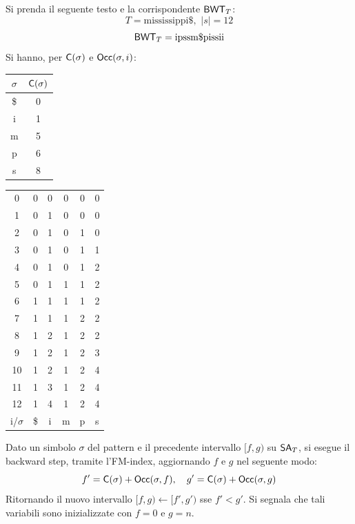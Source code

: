 \begin{esempio}
  Si prenda il seguente testo e la corrispondente $\mbox{\rm {\sf BWT}}_T$:
  \[T=\mbox{mississippi\$},\,\,|s|=12\]
  \[\mbox{\rm {\sf BWT}}_T=\mbox{ipssm\$pissii}\]
  \newpage
  Si hanno, per $\mbox{\rm {\sf C}}(\sigma)$ e $\mbox{\rm {\sf Occ}}(\sigma, i)$:
  \begin{table}[H]
    \centering
    \begin{tabular}{c||c}
      $\sigma$ & $\mbox{\rm {\sf C}}(\sigma)$\\
      \hline
      \hline
      \$ & 0\\
      i & 1 \\
      m & 5\\
      p & 6\\
      s & 8\\
    \end{tabular}\quad\quad\quad\quad\quad
    \begin{tabular}{c||c|c|c|c|c}
      0 & 0 & 0 & 0 & 0 & 0 \\
      1 & 0 & 1 & 0 & 0 & 0 \\
      2 & 0 & 1 & 0 & 1 & 0 \\
      3 & 0 & 1 & 0 & 1 & 1 \\
      4 & 0 & 1 & 0 & 1 & 2 \\
      5 & 0 & 1 & 1 & 1 & 2 \\
      6 & 1 & 1 & 1 & 1 & 2 \\
      7 & 1 & 1 & 1 & 2 & 2 \\
      8 & 1 & 2 & 1 & 2 & 2 \\
      9 & 1 & 2 & 1 & 2 & 3 \\
      10 & 1 & 2 & 1 & 2 & 4 \\
      11 & 1 & 3 & 1 & 2 & 4 \\
      12 & 1 & 4 & 1 & 2 & 4 \\
      \hline
      \hline
      i/$\sigma$ & \$ & i & m & p & s
    \end{tabular}
  \end{table}
\end{esempio}
Dato un simbolo $\sigma$ del pattern e il precedente intervallo $[f,g)$ su
$\mbox{\rm {\sf SA}}_T$, si esegue il backward step, tramite l'FM-index,
aggiornando $f$ e $g$ nel seguente modo: 
\begin{equation}
  \label{eq:bwt6}
  f'=\mbox{\rm {\sf C}}(\sigma)+\mbox{\rm {\sf Occ}}(\sigma, f),\quad g'=\mbox{\rm {\sf C}}(\sigma)+\mbox{\rm {\sf Occ}}(\sigma, g)
\end{equation}
Ritornando il nuovo intervallo $[f, g)\gets [f', g')$ sse $f'< g'$.
Si segnala che tali variabili sono inizializzate con $f=0$ e $g=n$.\\
